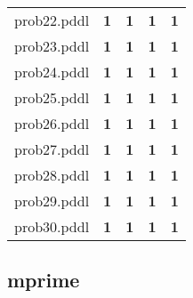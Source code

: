\documentclass{article}
\begin{document}
\begin{tabular}{@{}lrrrr@{}}
prob22.pddl & \textbf{1} & \textbf{1} & \textbf{1} & \textbf{1} \\
prob23.pddl & \textbf{1} & \textbf{1} & \textbf{1} & \textbf{1} \\
prob24.pddl & \textbf{1} & \textbf{1} & \textbf{1} & \textbf{1} \\
prob25.pddl & \textbf{1} & \textbf{1} & \textbf{1} & \textbf{1} \\
prob26.pddl & \textbf{1} & \textbf{1} & \textbf{1} & \textbf{1} \\
prob27.pddl & \textbf{1} & \textbf{1} & \textbf{1} & \textbf{1} \\
prob28.pddl & \textbf{1} & \textbf{1} & \textbf{1} & \textbf{1} \\
prob29.pddl & \textbf{1} & \textbf{1} & \textbf{1} & \textbf{1} \\
prob30.pddl & \textbf{1} & \textbf{1} & \textbf{1} & \textbf{1} \\
\end{tabular}

\hypertarget{coverage-mprime}{}
\subsection*{mprime}
\end{document}
